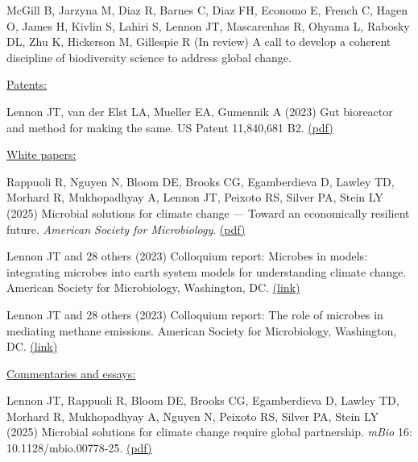\documentclass[11pt]{article}
\begin{document}
\begin{etaremune}
\item McGill B, Jarzyna M, Diaz R, Barnes C, Diaz FH, Economo E, French C, Hagen O, James H, Kivlin S, Lahiri S, Lennon JT, Mascarenhas R, Ohyama L, Rabosky DL, Zhu K, Hickerson M, Gillespie R (In review) A call to develop a coherent discipline of biodiversity science to address global change.

\vspace{1em}
\item[] \textnormal{\underline{Patents:}}
\item Lennon JT, van der Elst LA, Mueller EA, Gumennik A (2023) Gut bioreactor and method for making the same. US Patent 11,840,681 B2. \href{https://lennonlab.github.io/assets/publications/Lennon_etal_2023b.pdf}{(pdf)}

\vspace{1em}
\item[] \textnormal{\underline{White papers:}}

\item Rappuoli R, Nguyen N, Bloom DE, Brooks CG, Egamberdieva D, Lawley TD, Morhard R, Mukhopadhyay A, Lennon JT, Peixoto RS, Silver PA, Stein LY (2025) Microbial solutions for climate change — Toward an economically resilient future. \textit{American Society for Microbiology}. \href{https://lennonlab.github.io/assets/publications/Rappuoli_etal_2025b.pdf}{(pdf)}

\item Lennon JT and 28 others (2023) Colloquium report: Microbes in models: integrating microbes into earth system models for understanding climate change. American Society for Microbiology, Washington, DC. \href{https://www.ncbi.nlm.nih.gov/books/NBK592518/}{(link)}

\item Lennon JT and 28 others (2023) Colloquium report: The role of microbes in mediating methane emissions. American Society for Microbiology, Washington, DC. \href{https://pubmed.ncbi.nlm.nih.gov/38194471/}{(link)}

\vspace{1em}
\item[] \textnormal{\underline{Commentaries and essays:}}

\item Lennon JT, Rappuoli R, Bloom DE, Brooks CG, Egamberdieva D, Lawley TD, Morhard R, Mukhopadhyay A, Nguyen N, Peixoto RS, Silver PA, Stein LY (2025) Microbial solutions for climate change require global partnership. \textit{mBio} 16: 10.1128/mbio.00778-25. \href{https://lennonlab.github.io/assets/publications/Lennon_etal_2025a.pdf}{(pdf)}


\end{etaremune}
\end{document}
